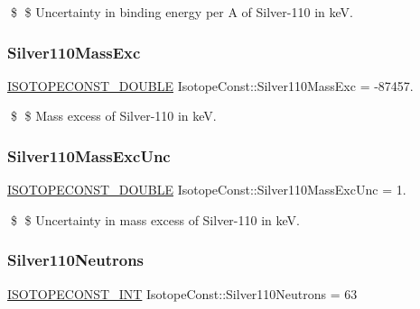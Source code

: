\$ \$ Uncertainty in binding energy per A of Silver-\/110 in keV. \mbox{\label{group___isotope_const-_silver-_ag110_ga3a787c3424945ba1c03c0e7495b5238e}} 
\subsubsection{\texorpdfstring{Silver110\+Mass\+Exc}{Silver110MassExc}}
{\footnotesize\ttfamily \mbox{\hyperlink{group___isotope_const-_macros_ga8f45a7272ce02c0b4c65c44636ed719a}{I\+S\+O\+T\+O\+P\+E\+C\+O\+N\+S\+T\+\_\+\+D\+O\+U\+B\+LE}} Isotope\+Const\+::\+Silver110\+Mass\+Exc = -\/87457.}

\$ \$ Mass excess of Silver-\/110 in keV. \mbox{\label{group___isotope_const-_silver-_ag110_gac8a336a7c019a83d9c2d7baef2f080ff}} 
\subsubsection{\texorpdfstring{Silver110\+Mass\+Exc\+Unc}{Silver110MassExcUnc}}
{\footnotesize\ttfamily \mbox{\hyperlink{group___isotope_const-_macros_ga8f45a7272ce02c0b4c65c44636ed719a}{I\+S\+O\+T\+O\+P\+E\+C\+O\+N\+S\+T\+\_\+\+D\+O\+U\+B\+LE}} Isotope\+Const\+::\+Silver110\+Mass\+Exc\+Unc = 1.}

\$ \$ Uncertainty in mass excess of Silver-\/110 in keV. \mbox{\label{group___isotope_const-_silver-_ag110_ga13271a344fc9127c695addf24b5ca4db}} 
\subsubsection{\texorpdfstring{Silver110\+Neutrons}{Silver110Neutrons}}
{\footnotesize\ttfamily \mbox{\hyperlink{group___isotope_const-_macros_ga5f18360b3e99483a35c32d789e62621c}{I\+S\+O\+T\+O\+P\+E\+C\+O\+N\+S\+T\+\_\+\+I\+NT}} Isotope\+Const\+::\+Silver110\+Neutrons = 63}

